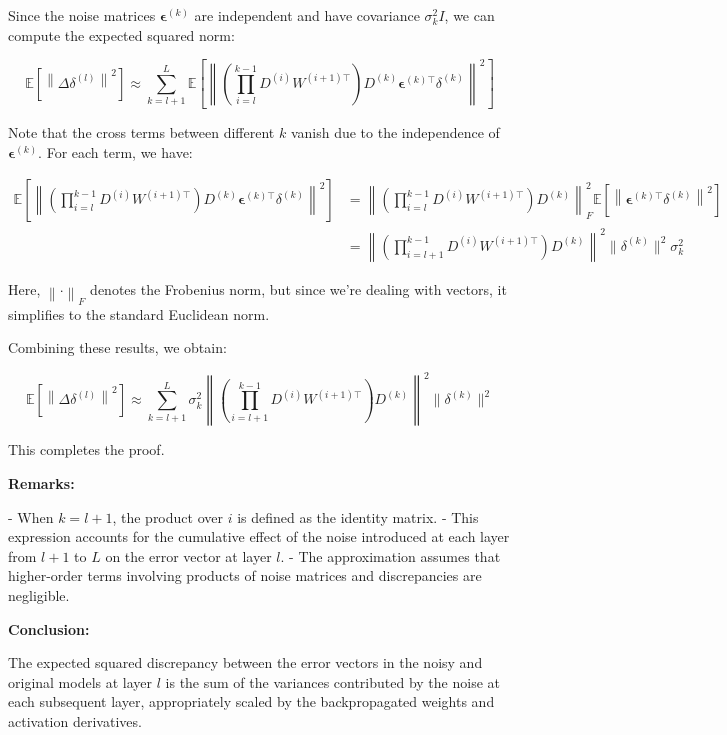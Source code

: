 \documentclass{article}
\newcommand{\1}{\mathbf{1}}
\begin{document}
Since the noise matrices \(\boldsymbol{\epsilon}^{(k)}\) are independent and have covariance \(\sigma_k^2 I\), we can compute the expected squared norm:

\[
\mathbb{E}\left[ \left\| \Delta \delta^{(l)} \right\|^2 \right] \approx \sum_{k = l+1}^{L} \mathbb{E}\left[ \left\| \left( \prod_{i = l}^{k-1} D^{(i)} W^{(i+1)\top} \right) D^{(k)} \boldsymbol{\epsilon}^{(k)\top} \delta^{(k)} \right\|^2 \right]
\]

Note that the cross terms between different \(k\) vanish due to the independence of \(\boldsymbol{\epsilon}^{(k)}\). For each term, we have:

\[
\begin{aligned}
\mathbb{E}\left[ \left\| \left( \prod_{i = l}^{k-1} D^{(i)} W^{(i+1)\top} \right) D^{(k)} \boldsymbol{\epsilon}^{(k)\top} \delta^{(k)} \right\|^2 \right] &= \left\| \left( \prod_{i = l}^{k-1} D^{(i)} W^{(i+1)\top} \right) D^{(k)} \right\|^2_F \mathbb{E}\left[ \left\| \boldsymbol{\epsilon}^{(k)\top} \delta^{(k)} \right\|^2 \right] \\
&= \left\| \left( \prod_{i = l+1}^{k-1} D^{(i)} W^{(i+1)\top} \right) D^{(k)} \right\|^2 \|\delta^{(k)} \|^2 \sigma_k^2
\end{aligned}
\]

Here, \(\left\| \cdot \right\|_F\) denotes the Frobenius norm, but since we're dealing with vectors, it simplifies to the standard Euclidean norm.

Combining these results, we obtain:

\[
\mathbb{E}\left[ \left\| \Delta \delta^{(l)} \right\|^2 \right] \approx \sum_{k = l+1}^{L} \sigma_k^2 \left\| \left( \prod_{i = l+1}^{k-1} D^{(i)} W^{(i+1)\top} \right) D^{(k)}\right\|^2\|\delta^{(k)} \|^2
\]

This completes the proof.

\textbf{Remarks:}

- When \(k = l+1\), the product over \(i\) is defined as the identity matrix.
- This expression accounts for the cumulative effect of the noise introduced at each layer from \(l+1\) to \(L\) on the error vector at layer \(l\).
- The approximation assumes that higher-order terms involving products of noise matrices and discrepancies are negligible.

\textbf{Conclusion:}

The expected squared discrepancy between the error vectors in the noisy and original models at layer \(l\) is the sum of the variances contributed by the noise at each subsequent layer, appropriately scaled by the backpropagated weights and activation derivatives.
\end{document}
